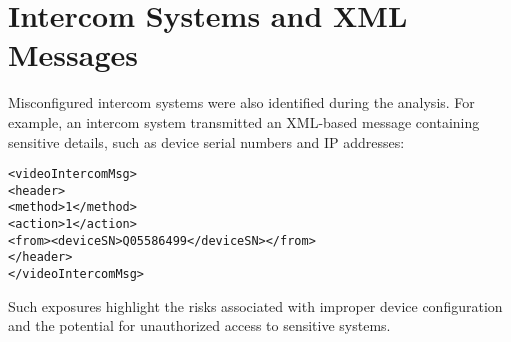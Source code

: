 \section{Intercom Systems and XML Messages}
Misconfigured intercom systems were also identified during the analysis. For example, an intercom system transmitted an XML-based message containing sensitive details, such as device serial numbers and IP addresses:
\begin{verbatim}
<videoIntercomMsg>
<header>
<method>1</method>
<action>1</action>
<from><deviceSN>Q05586499</deviceSN></from>
</header>
</videoIntercomMsg>
\end{verbatim}
Such exposures highlight the risks associated with improper device configuration and the potential for unauthorized access to sensitive systems.


